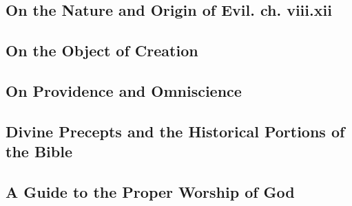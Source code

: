 \documentclass[a4paper,11pt]{article}
\begin{document}
\subsection{On the Nature and Origin of Evil. ch. viii.xii}
\subsection{On the Object of Creation}
\subsection{On Providence and Omniscience}
\subsection{Divine Precepts and the Historical Portions of the Bible}
\subsection{A Guide to the Proper Worship of God}
\end{document}
